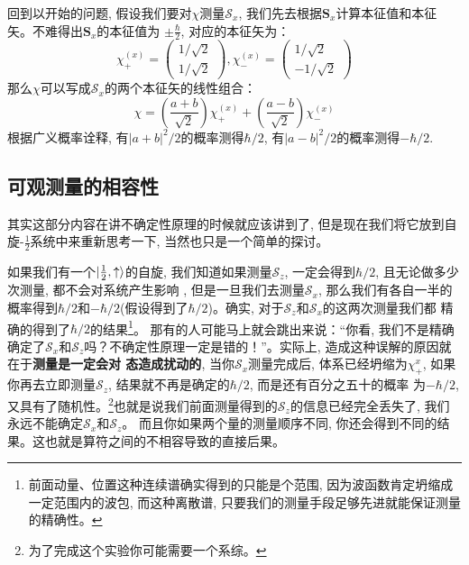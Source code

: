 \documentclass[a4paper,zihao=-4,linespread=1]{ctexrep}
\begin{document}
    回到以开始的问题, 假设我们要对$\chi$测量$\mathcal{S}_x$, 我们先去根据$\mathbf{S}_x$计算本征值和本征矢。不难得出$\mathbf{S}_x$的本征值为
    $\pm\frac{\hbar}{2}$, 对应的本征矢为：
    \begin{equation}
        \chi_+^{(x)}=\begin{pmatrix}
            1/\sqrt{2}\\
            1/\sqrt{2}
        \end{pmatrix},
        \chi_-^{(x)}=\begin{pmatrix}
            1/\sqrt{2}\\
            -1/\sqrt{2}
        \end{pmatrix}
    \end{equation}
    那么$\chi$可以写成$\mathcal{S}_x$的两个本征矢的线性组合：
    \begin{equation}
        \chi=\left(\frac{a+b}{\sqrt{2}}\right) \chi_{+}^{(x)}+\left(\frac{a-b}{\sqrt{2}}\right) \chi_{-}^{(x)}
    \end{equation}
    根据广义概率诠释, 有$|a+b|^2/2$的概率测得$\hbar/2$, 有$|a-b|^2/2$的概率测得$-\hbar/2$.

    \subsection{可观测量的相容性}
    其实这部分内容在讲不确定性原理的时候就应该讲到了, 但是现在我们将它放到自旋-$\frac{1}{2}$系统中来重新思考一下, 当然也只是一个简单的探讨。

    如果我们有一个$\ket{\frac{1}{2},\uparrow}$的自旋, 我们知道如果测量$\mathcal{S}_z$, 一定会得到$\hbar/2$, 且无论做多少次测量, 都不会对系统产生影响
    , 但是一旦我们去测量$\mathcal{S}_x$, 那么我们有各自一半的概率得到$\hbar/2$和$-\hbar/2$(假设得到了$\hbar/2$)。确实, 对于$\mathcal{S}_z$和$\mathcal{S}_x$的这两次测量我们都
    精确的得到了$\hbar/2$的结果\footnote{前面动量、位置这种连续谱确实得到的只能是个范围, 因为波函数肯定坍缩成一定范围内的波包, 而这种离散谱, 只要我们的测量手段足够先进就能保证测量的精确性。}。
    那有的人可能马上就会跳出来说：“你看, 我们不是精确确定了$\mathcal{S}_x$和$\mathcal{S}_z$吗？不确定性原理一定是错的！”。实际上, 造成这种误解的原因就在于\textbf{测量是一定会对
    态造成扰动的}, 当你$\mathcal{S}_x$测量完成后, 体系已经坍缩为$\chi_{+}^x$, 如果你再去立即测量$\mathcal{S}_z$, 结果就不再是确定的$\hbar/2$, 而是还有百分之五十的概率
    为$-\hbar/2$, 又具有了随机性。\footnote{为了完成这个实验你可能需要一个系综。}也就是说我们前面测量得到的$\mathcal{S}_z$的信息已经完全丢失了, 我们永远不能确定$\mathcal{S}_x$和$\mathcal{S}_z$。
    而且你如果两个量的测量顺序不同, 你还会得到不同的结果。这也就是算符之间的不相容导致的直接后果。
\end{document}
